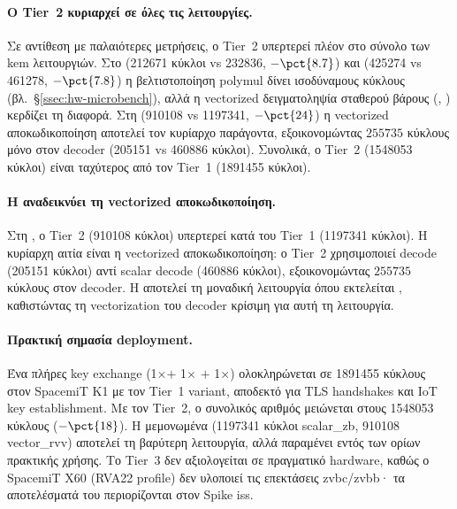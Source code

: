 \paragraph{Ο Tier~2 κυριαρχεί σε όλες τις λειτουργίες.}
Σε αντίθεση με παλαιότερες μετρήσεις, ο Tier~2 υπερτερεί
πλέον στο σύνολο των \gls{kem} λειτουργιών. Στο \KeyGen (\num{212671}
κύκλοι vs \num{232836}, $-\pct{8.7}$) και \Encaps (\num{425274} vs
\num{461278}, $-\pct{7.8}$) η βελτιστοποίηση polymul δίνει ισοδύναμους
κύκλους (βλ.\ §\ref{ssec:hw-microbench}), αλλά η vectorized δειγματοληψία σταθερού βάρους (, ) κερδίζει τη διαφορά. Στη \Decaps (\num{910108} vs
\num{1197341}, $-\pct{24}$) η vectorized αποκωδικοποίηση αποτελεί τον
κυρίαρχο παράγοντα, εξοικονομώντας $\num{255735}$ κύκλους μόνο στον
decoder (\num{205151} vs \num{460886} κύκλοι). Συνολικά, ο
Tier~2 (\num{1548053} κύκλοι) είναι  ταχύτερος
από τον Tier~1 (\num{1891455} κύκλοι).

\paragraph{Η \Decaps αναδεικνύει τη vectorized αποκωδικοποίηση.}
Στη \Decaps, ο Tier~2 (\num{910108} κύκλοι) υπερτερεί
κατά  του Tier~1 (\num{1197341} κύκλοι). Η
κυρίαρχη αιτία είναι η vectorized αποκωδικοποίηση: ο Tier~2
χρησιμοποιεί \RVV decode (\num{205151} κύκλοι) αντί scalar decode
(\num{460886} κύκλοι), εξοικονομώντας $\num{255735}$ κύκλους στον decoder.
Η \Decaps αποτελεί τη μοναδική λειτουργία όπου εκτελείται
, καθιστώντας τη vectorization του decoder κρίσιμη
για αυτή τη λειτουργία.

\paragraph{Πρακτική σημασία deployment.}
Ένα πλήρες  key exchange (1$\times$\KeyGen $+$ 1$\times$\Encaps
$+$ 1$\times$\Decaps) ολοκληρώνεται σε \num{1891455} κύκλους
στον SpacemiT K1 με τον Tier~1 variant, αποδεκτό για
TLS handshakes και IoT key establishment. Με τον Tier~2,
ο συνολικός αριθμός μειώνεται στους \num{1548053} κύκλους ($-\pct{18}$).
Η \Decaps μεμονωμένα
(\num{1197341} κύκλοι scalar\_zb, \num{910108} vector\_rvv)
αποτελεί τη βαρύτερη λειτουργία, αλλά παραμένει εντός των ορίων
πρακτικής χρήσης. Το Tier~3 δεν αξιολογείται σε
πραγματικό hardware, καθώς ο SpacemiT X60 (RVA22 profile) δεν υλοποιεί
τις επεκτάσεις \gls{zvbc}/\gls{zvbb}· τα αποτελέσματά του περιορίζονται
στον Spike \gls{iss}.

